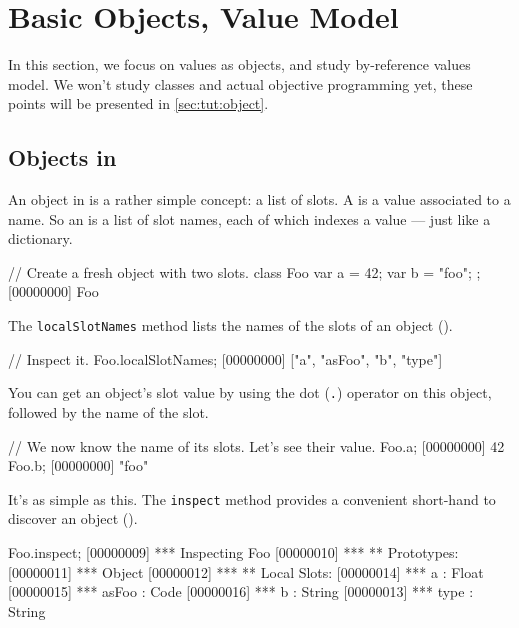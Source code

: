 \chapter{Basic Objects, Value Model}
\label{sec:tut:value}

In this section, we focus on \us values as objects, and study \us
by-reference values model. We won't study classes and actual objective
programming yet, these points will be presented in
\autoref{sec:tut:object}.

\section{Objects in \us}
\label{sec:tut:objects}
An object in \us is a rather simple concept: a list of slots. A
 is a value associated to a name. So an  is a
list of slot names, each of which indexes a value --- just like a
dictionary.

\begin{urbiscript}[firstnumber=1]
// Create a fresh object with two slots.
class Foo
{
  var a = 42;
  var b = "foo";
};
[00000000] Foo
\end{urbiscript}

The \lstinline{localSlotNames} method lists the names of the slots of
an object ().

\begin{urbiscript}
// Inspect it.
Foo.localSlotNames;
[00000000] ["a", "asFoo", "b", "type"]
\end{urbiscript} %

You can get an object's slot value by using the dot (\lstinline{.})
operator on this object, followed by the name of the slot.

\begin{urbiscript}
// We now know the name of its slots. Let's see their value.
Foo.a;
[00000000] 42
Foo.b;
[00000000] "foo"
\end{urbiscript}

It's as simple as this.  The \lstinline|inspect| method provides a
convenient short-hand to discover an object ().

\begin{urbiscript}
Foo.inspect;
[00000009] *** Inspecting Foo
[00000010] *** ** Prototypes:
[00000011] ***   Object
[00000012] *** ** Local Slots:
[00000014] ***   a : Float
[00000015] ***   asFoo : Code
[00000016] ***   b : String
[00000013] ***   type : String
\end{urbiscript} %

